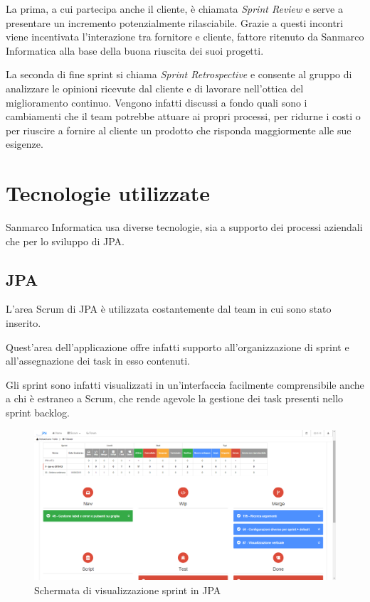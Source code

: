 La prima, a cui partecipa anche il cliente, è chiamata \emph{Sprint Review} e
serve a presentare un incremento potenzialmente rilasciabile. Grazie
a questi incontri viene incentivata l'interazione tra fornitore e cliente,
fattore ritenuto da Sanmarco Informatica alla base della buona riuscita dei
suoi progetti.

La seconda  di fine sprint si chiama \emph{Sprint
Retrospective} e consente al gruppo di analizzare le opinioni ricevute dal
cliente e di lavorare nell'ottica del miglioramento continuo. Vengono infatti
discussi a fondo quali sono i cambiamenti che il team potrebbe attuare ai
propri processi, per ridurne i costi o per riuscire a fornire al cliente un
prodotto che risponda maggiormente alle sue esigenze.
\section{Tecnologie utilizzate}

Sanmarco Informatica usa diverse tecnologie, sia a supporto dei processi
aziendali che per lo sviluppo di JPA.

\subsection{JPA}

L'area Scrum di JPA è utilizzata costantemente dal team in cui sono stato
inserito.

Quest'area dell'applicazione offre infatti supporto all'organizzazione di
sprint e all'assegnazione dei task in esso contenuti.

Gli sprint sono infatti visualizzati in un'interfaccia facilmente comprensibile
anche a chi è estraneo a Scrum, che rende agevole la gestione dei task presenti
nello sprint backlog.

\begin{figure}%
\includegraphics[width=\columnwidth]{immagini/jpa-sprint-viewer}%
\caption{Schermata di visualizzazione sprint in JPA}%
\label{fig:jpa-viewer}%
\end{figure}


